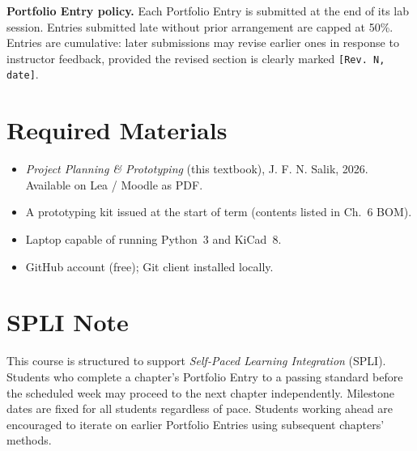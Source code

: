 \documentclass[twoside]{../Sparkle}
\begin{document}
\bigskip

\noindent\textbf{Portfolio Entry policy.}\quad
Each Portfolio Entry is submitted at the end of its lab session.
Entries submitted late without prior arrangement are capped at 50\%.
Entries are cumulative: later submissions may revise earlier ones in response to
instructor feedback, provided the revised section is clearly marked
\texttt{[Rev.\ N, date]}.

\section*{Required Materials}

\begin{itemize}
\item \textit{Project Planning \& Prototyping} (this textbook), J. F. N. Salik, 2026.
      Available on Lea / Moodle as PDF.
\item A prototyping kit issued at the start of term (contents listed in Ch.~6 BOM).
\item Laptop capable of running Python~3 and KiCad~8.
\item GitHub account (free); Git client installed locally.
\end{itemize}

\section*{SPLI Note}

This course is structured to support \emph{Self-Paced Learning Integration} (SPLI).
Students who complete a chapter's Portfolio Entry to a passing standard before the
scheduled week may proceed to the next chapter independently.
Milestone dates are fixed for all students regardless of pace.
Students working ahead are encouraged to iterate on earlier Portfolio Entries
using subsequent chapters' methods.
\end{document}
